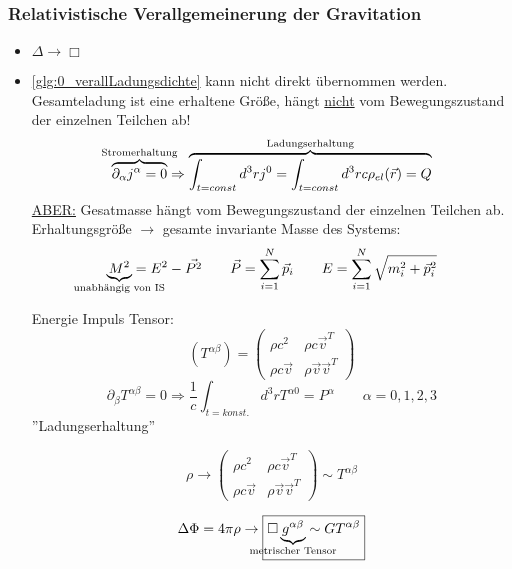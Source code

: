 \documentclass[a4paper, 11pt]{article}
\numberwithin{equation}{section}
\begin{document}
\subsubsection*{Relativistische Verallgemeinerung der Gravitation}
\renewcommand{\labelitemi}{$\bullet$}
\begin{itemize}
\item $\Delta \rightarrow \Box$

\item \ref{glg:0_verallLadungsdichte} kann nicht direkt übernommen werden.\\
Gesamteladung ist eine erhaltene Größe, hängt \underline{nicht} vom Bewegungszustand der einzelnen Teilchen ab!
\begin{equation}
\overbrace{\partial_\alpha j^\alpha = 0}^{\mathclap{\text{Stromerhaltung}}} \Rightarrow \overbrace{\int_{t=const}d^3rj^0 = \int_{t=const}d^3rc \rho_{el}(\vec{r}) = Q}^{\text{Ladungserhaltung}}
\end{equation}
\underline{ABER:} Gesatmasse hängt vom Bewegungszustand der einzelnen Teilchen ab.\\
Erhaltungsgröße $\rightarrow$ gesamte invariante Masse des Systems:
\begin{equation}
\underbrace{M^2}_{\mathclap{\text{unabhängig von IS}}} = E^2 - \vec{P^2} \qquad \vec{P} = \sum_{i=1}^N \vec{p}_i \qquad E= \sum_{i=1}^N \sqrt{m_i^2+\vec{p}_i^2}
\end{equation}

Energie Impuls Tensor:
\begin{equation*}
(T^{\alpha\beta}) =  \begin{pmatrix}
\rho c^2 & \rho c \vec{v}^T \\
\rho c \vec{v} & \rho \vec{v} \vec{v}^T
\end{pmatrix}
\end{equation*}
\begin{equation}
\partial_\beta T^{\alpha\beta} = 0 \Rightarrow \dfrac{1}{c} \int_{t=konst.}d^3r T^{\alpha 0} = P^\alpha \qquad \alpha = 0,1,2,3
\end{equation}
''Ladungserhaltung'' 

\begin{equation}
\rho \rightarrow \begin{pmatrix}
\rho c^2 & \rho c \vec{v}^T \\
\rho c \vec{v} & \rho \vec{v} \vec{v}^T
\end{pmatrix} \sim T^{\alpha \beta}
\end{equation}


\begin{equation}
\Delta \Phi = 4 \pi \rho \rightarrow \boxed{\Box \underbrace{g^{\alpha \beta}}_{\mathclap{\text{metrischer Tensor}}} \sim G T^{\alpha\beta}   }
\end{equation}
\end{itemize}
\end{document}
